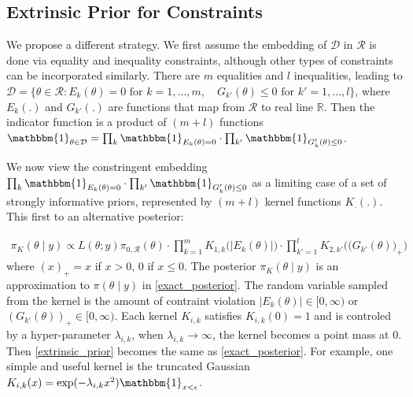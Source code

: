 \documentclass[10pt]{article}
\newcommand{\mc}[1]{\mathcal{#1}}
\begin{document}

\subsection{Extrinsic Prior for Constraints}

We propose a different strategy. We first assume the embedding of $\mc D$ in $\mc R$ is done via equality and inequality constraints, although other types of constraints can be incorporated similarly. There are $m$ equalities and $l$ inequalities, leading to $\mc D = \{ \theta \in \mc R: E_k(\theta)=0 \text{ for } k=1,\ldots,m, \quad G_{k'}(\theta)\le 0  \text{ for } k'=1,\ldots,l \}$, where $E_k(.)$ and $G_{k'}(.)$ are functions that map from $\mc R$ to real line $\mathbb R$. Then the indicator function is a product of $(m+l)$ functions $\mathbbm{1}_{\theta\in \mc D} = \prod_k \mathbbm{1}_{E_k(\theta)=0} \cdot \prod_{k'}\mathbbm{1}_{G_k'(\theta)\le 0}$.


We now view the constringent embedding $\prod_k \mathbbm{1}_{E_k(\theta)=0} \cdot \prod_{k'}\mathbbm{1}_{G_k'(\theta)\le 0}$ as a limiting case of a set of strongly informative priors, represented by $(m+l)$ kernel functions $K_.(.)$. This first to an alternative posterior:

\begin{equation}
\begin{aligned}
\label{extrinsic_prior}
\pi_{K}(\theta \mid y) \propto L(\theta;y)\pi_{0,\mc R}(\theta) \cdot \prod_{k=1}^{m} K_{1,k}\Big( | E_k(\theta)| \Big) \cdot \prod_{k'=1}^{l} K_{2,k'}\Big( \big( G_{k'}(\theta) \big)_+ \Big)
\end{aligned}
\end{equation}
where $(x)_+ = x$ if $x>0$, $0$ if $x\le 0$. The posterior $\pi_{K}(\theta \mid y)$ is an approximation to $\pi(\theta \mid y)$ in \eqref{exact_posterior}. The random variable sampled from the kernel is the amount of contraint violation $|E_k(\theta)|\in [0,\infty)$ or $(G_{k'}(\theta))_+ \in [0,\infty)$. Each kernel $K_{i,k}$ satisfies $K_{i,k}(0)=1$ and is controled by a hyper-parameter $\lambda_{i,k}$, when $\lambda_{i,k} \rightarrow \infty$, the kernel becomes a point mass at $0$. Then \eqref{extrinsic_prior} becomes the same as \eqref{exact_posterior}. For example, one simple and useful kernel is the truncated Gaussian $K_{i,k}(x) = \exp( -{\lambda_{i,k} x^2}) \mathbbm{1}_{x<\epsilon}$.
\end{document}
